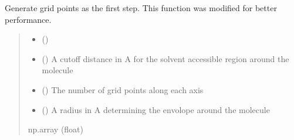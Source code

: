 \documentclass[letterpaper,10pt,english]{sphinxmanual}
\begin{document}

\begin{fulllineitems}
\label{\detokenize{fcdft.solvent:fcdft.solvent.esp.esp_grid}}
\pysigstartsignatures
\pysiglinewithargsret
{}
{\sphinxparamcomma {}\sphinxparamcomma {}\sphinxparamcomma {}}
{}
\pysigstopsignatures
\sphinxAtStartPar
Generate grid points as the first step. This function was modified for better performance.
\begin{quote}\begin{description}
\begin{itemize}
\item {} 
\sphinxAtStartPar
{} (\sphinxstyleliteralemphasis{\sphinxupquote{(}}\sphinxstyleliteralemphasis{\sphinxupquote{) }})

\item {} 
\sphinxAtStartPar
{} () \textendash{} A cut\sphinxhyphen{}off distance in A for the solvent accessible region around the molecule

\item {} 
\sphinxAtStartPar
{} () \textendash{} The number of grid points along each axis

\item {} 
\sphinxAtStartPar
{} () \textendash{} A radius in A determining the envolope around the molecule

\end{itemize}

\sphinxAtStartPar
{}

\sphinxAtStartPar
np.array (float)

\end{description}\end{quote}

\end{fulllineitems}
\end{document}
